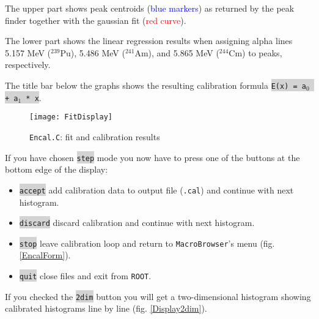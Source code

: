 \documentclass[10pt]{article}
\newcommand{\gray}[1]{\colorbox{lightgray}{\texttt{#1}}}
\newcommand{\redt}[1]{\textcolor{red}{#1}}
\newcommand{\bluet}[1]{\textcolor{blue}{#1}}
\begin{document}
The upper part shows peak centroids (\bluet{blue markers}) as
returned by the peak finder together with the gaussian fit (\redt{red curve}).

The lower part shows the linear regression results
when assigning alpha lines 5.157 MeV ($^{239}$Pu), 5.486 MeV ($^{241}$Am), and 5.865 MeV ($^{244}$Cm) to peaks, respectively.

The title bar below the graphs shows the resulting calibration formula \gray{E(x) = a$_0$ + a$_1$ * x}.\vspace{1cm}
\begin{figure}[H]
\centerline{\texttt{[image: FitDisplay]}}
\caption{\texttt{Encal.C}: fit and calibration results}
\label{FitDisplay}
\end{figure}

If you have chosen \gray{step} mode you now have to press one of the buttons at the bottom edge of the display:
\begin{center}
\begin{itemize}
\setlength{\rightmargin}{1em}%
\setlength{\leftmargin}{2em}%
\setlength{\itemsep}{0pt}%
\setlength{\parskip}{1mm}%
\setlength{\partopsep}{0pt}%
\setlength{\parsep}{0pt}%
\setlength{\topsep}{0pt}%
\item	\gray{accept}
	add calibration data to output file (\texttt{.cal}) and continue with next histogram.
\item	\gray{discard}
	discard calibration and continue with next histogram.
\item	\gray{stop}
	leave calibration loop and return to \texttt{MacroBrowser}'s menu (fig. \ref{EncalForm}).
\item	\gray{quit}
	close files and exit from \texttt{ROOT}.
\end{itemize}\vspace{.5cm}
\end{center}
\newpage
If you checked the \gray{2dim} button you will get a two-dimensional histogram showing calibrated
histograms line by line (fig. \ref{Display2dim}).
\end{document}
